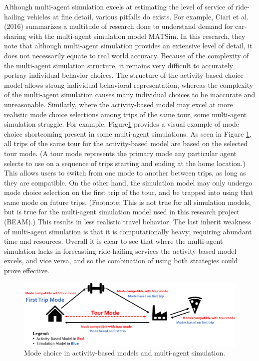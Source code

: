 \documentclass[fancy, masters]{byuthesis}
\begin{document}
Although multi-agent simulation excels at estimating the level of service of ride-hailing vehicles at fine detail, various pitfalls do exists. For example, Ciari et al. (2016) summarizes a multitude of research done to understand demand for car-sharing with the multi-agent simulation model MATSim. In this research, they note that although multi-agent simulation provides an extensive level of detail, it does not necessarily equate to real world accuracy. Because of the complexity of the multi-agent simulation structure, it remains very difficult to accurately portray individual behavior choices. The structure of the activity-based choice model allows strong individual behavioral representation, whereas the complexity of the multi-agent simulation causes many individual choices to be inaccurate and unreasonable. Similarly, where the activity-based model may excel at more realistic mode choice selections among trips of the same tour, some multi-agent simulation struggle. For example, Figure\ref{fig:fig-mode-compare} provides a visual example of mode choice shortcoming present in some multi-agent simulations. As seen in Figure \ref{fig:fig-mode-compare}, all trips of the same tour for the activity-based model are based on the selected tour mode. (A tour mode represents the primary mode any particular agent selects to use on a sequence of trips starting and ending at the home location.) This allows users to switch from one mode to another between trips, as long as they are compatible. On the other hand, the simulation model may only undergo mode choice selection on the first trip of the tour, and be trapped into using that same mode on future trips. (Footnote: This is not true for all simulation models, but is true for the multi-agent simulation model used in this research project (BEAM).) This results in less realistic travel behavior. The last inherit weakness of multi-agent simulation is that it is computationally heavy; requiring abundant time and resources. Overall it is clear to see that where the multi-agent simulation lacks in forecasting ride-hailing services the activity-based model excels, and vice versa, and so the combination of using both strategies could prove effective.

\begin{figure}

{\centering \includegraphics[width=1\linewidth]{pics/abm-mas-compare} 

}

\caption{Mode choice in activity-based models and multi-agent simulation.}\label{fig:fig-mode-compare}
\end{figure}
\end{document}
